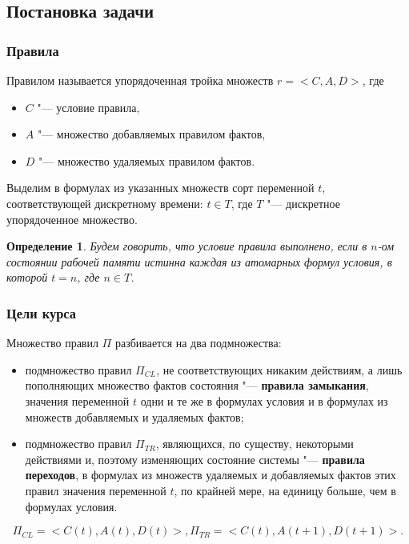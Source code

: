\documentclass[default]{beamer}
\newtheorem{Def}{Определение}
\begin{document}
	\subsection{Постановка задачи}

	\begin{frame}
		\frametitle{Правила}
		
		Правилом называется упорядоченная тройка множеств $r=<C,A,D>$, где
		\begin{itemize}
			\item $C$ "--- условие правила,
			\item $A$ "--- множество добавляемых правилом фактов,
			\item $D$ "--- множество удаляемых правилом фактов.
		\end{itemize}
		\par\bigskip
		Выделим в формулах из указанных множеств сорт переменной $t$, соответствующей дискретному времени: $t\in T$, где $T$ "--- дискретное упорядоченное множество.
		
		\begin{Def}
			Будем говорить, что условие правила выполнено, если в $n$-ом состоянии рабочей памяти истинна каждая из атомарных формул условия, в которой $t=n$, где $n\in T$.
		\end{Def}
	\end{frame}

	\begin{frame}
		\frametitle{Цели курса}
		
		Множество правил $\Pi$ разбивается на два подмножества:
		\begin{itemize}
			\item подмножество правил $\Pi_{CL}$, не соответствующих никаким действиям, а лишь пополняющих множество фактов состояния "--- \textbf{правила  замыкания}, значения переменной $t$ одни и те же в формулах условия и в формулах из множеств добавляемых и удаляемых фактов;
			\item подмножество правил $\Pi_{TR}$, являющихся, по существу, некоторыми действиями и, поэтому изменяющих состояние системы "--- \textbf{правила переходов}, в формулах из множеств удаляемых и добавляемых фактов этих правил значения переменной $t$, по крайней мере, на единицу больше, чем в формулах условия.
		\end{itemize}

		\begin{equation}
			\Pi_{CL}= <C(t),A(t),D(t)>, \Pi_{TR} = <C(t),A(t+1),D(t+1)>.
		\end{equation}
	\end{frame}
\end{document}
